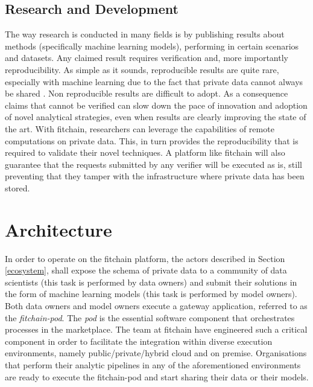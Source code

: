 \documentclass[12pt, a4paper,titlepage]{extreport}
\begin{document}
\subsection{Research and Development}
The way research is conducted in many fields is by publishing results about methods (specifically machine learning models), performing in certain scenarios and datasets. Any claimed result requires verification and, more importantly reproducibility. 
As simple as it sounds, reproducible results are quite rare, especially with machine learning due to the fact that private data cannot always be shared \cite{forbesreproducibility}. Non reproducible results are difficult to adopt. As a consequence claims that cannot be verified can slow down the pace of innovation and adoption of novel analytical strategies, even when results are clearly improving the state of the art.
With fitchain, researchers can leverage the capabilities of remote computations on private data. This, in turn provides the reproducibility that is required to validate their novel techniques. 
A platform like fitchain will also guarantee that the requests submitted by any verifier will be executed as is, still preventing that they tamper with the infrastructure where private data has been stored. 

\section{Architecture}
In order to operate on the fitchain platform, the actors described in Section \ref{ecosystem}, shall expose the schema of private data to a community of data scientists (this task is performed by data owners) and submit their solutions in the form of machine learning models (this task is performed by model owners). Both data owners and model owners execute a gateway application, referred to as the \textit{fitchain-pod}. The \textit{pod} is the essential software component that orchestrates processes in the marketplace.
The team at fitchain have engineered such a critical component in order to facilitate the integration within diverse execution environments, namely public/private/hybrid cloud and on premise. 
Organisations that perform their analytic pipelines in any of the aforementioned environments are ready to execute the fitchain-pod and start sharing their data or their models. 
\end{document}

